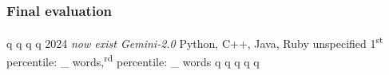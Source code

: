 \subsubsection*{Final evaluation}


\expandafter\def\csname AIGCodeSetHumanCode\endcsname{q}
\expandafter\def\csname AIGCodeSetLLMCode\endcsname{q}
\expandafter\def\csname AIGCodeSetNumLLMs\endcsname{q}
\expandafter\def\csname AIGCodeSetLLMDiversity\endcsname{q}
\expandafter\def\csname AIGCodeSetCurrentUse\endcsname{2024 \textit{now exist Gemini-2.0}}
\expandafter\def\csname AIGCodeSetLanguages\endcsname{Python, C++, Java, Ruby}
\expandafter\def\csname AIGCodeSetCodeTypes\endcsname{unspecified}
\expandafter\def\csname AIGCodeSetCodeSize\endcsname{1\textsuperscript{st} percentile: _ words,\textsuperscript{rd} percentile: _ words}
\expandafter\def\csname AIGCodeSetCodeContext\endcsname{q}
\expandafter\def\csname AIGCodeSetPrompts\endcsname{q}
\expandafter\def\csname AIGCodeSetSources\endcsname{q}
\expandafter\def\csname AIGCodeSetCodeQuality\endcsname{q}
\expandafter\def\csname AIGCodeSetReliability\endcsname{q}



